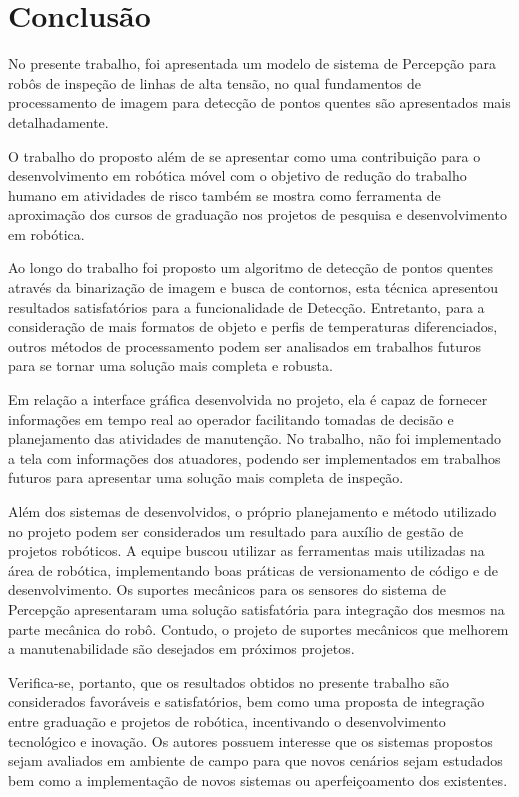 \chapter{Conclusão}
\label{chap:conc}

No presente trabalho, foi apresentada um modelo de sistema de Percepção para robôs de inspeção de linhas de alta tensão, no qual fundamentos de processamento de imagem para detecção de pontos quentes são apresentados mais detalhadamente.

O trabalho do proposto além de se apresentar como uma contribuição para o desenvolvimento em robótica móvel com o objetivo de redução do trabalho humano em atividades de risco também se mostra como ferramenta de aproximação dos cursos de graduação nos projetos de pesquisa e desenvolvimento em robótica.

Ao longo do trabalho foi proposto um algoritmo de detecção de pontos quentes através da binarização de imagem e busca de contornos, esta técnica apresentou resultados satisfatórios para a funcionalidade de Detecção. Entretanto, para a consideração de mais formatos de objeto e perfis de temperaturas diferenciados, outros métodos de processamento podem ser analisados em trabalhos futuros para se tornar uma solução mais completa e robusta.

Em relação a interface gráfica desenvolvida no projeto, ela é capaz de fornecer informações em tempo real ao operador facilitando tomadas de decisão e planejamento das atividades de manutenção. No trabalho, não foi implementado a tela com informações dos atuadores, podendo ser implementados em trabalhos futuros para apresentar uma solução mais completa de inspeção.

Além dos sistemas de desenvolvidos, o próprio planejamento e método utilizado no projeto podem ser considerados um resultado para auxílio de gestão de projetos robóticos. A equipe buscou utilizar as ferramentas mais utilizadas na área de robótica, implementando boas práticas de versionamento de código e de desenvolvimento.
Os suportes mecânicos para os sensores do sistema de Percepção apresentaram uma solução satisfatória para integração dos mesmos na parte mecânica do robô. Contudo, o projeto de suportes mecânicos que melhorem a manutenabilidade são desejados em próximos projetos.

Verifica-se, portanto, que os resultados obtidos no presente trabalho são considerados favoráveis e satisfatórios, bem como uma proposta de integração entre graduação e projetos de robótica, incentivando o desenvolvimento tecnológico e inovação. Os autores possuem interesse que os sistemas propostos sejam avaliados em ambiente de campo para que novos cenários sejam estudados bem como a implementação de novos sistemas ou aperfeiçoamento dos existentes.
